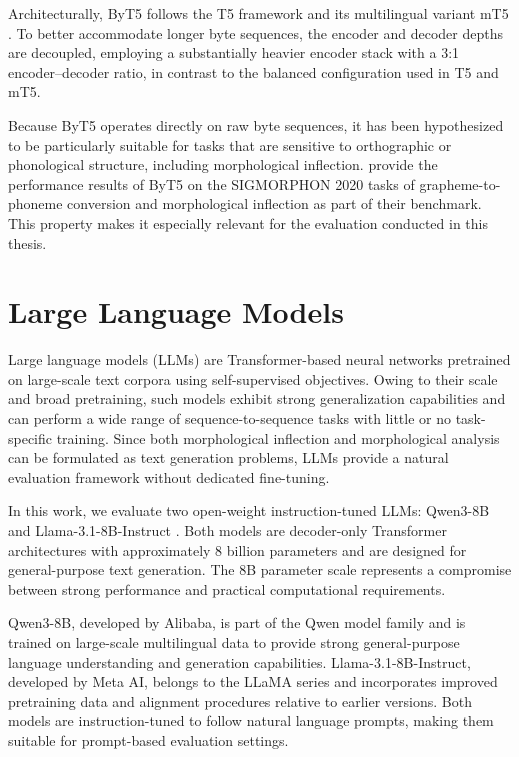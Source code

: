 Architecturally, ByT5 follows the T5 framework and its multilingual variant mT5 \parencite{xue-etal-2021-mt5}. To better accommodate longer byte sequences, the encoder and decoder depths are decoupled, employing a substantially heavier encoder stack with a 3:1 encoder–decoder ratio, in contrast to the balanced configuration used in T5 and mT5.

Because ByT5 operates directly on raw byte sequences, it has been hypothesized to be particularly suitable for tasks that are sensitive to orthographic or phonological structure, including morphological inflection. \textcite{xue-etal-2022-byt5} provide the performance results of ByT5 on the SIGMORPHON 2020 \parencite{vylomova-etal-2020-sigmorphon} tasks of grapheme-to-phoneme conversion and morphological inflection as part of their benchmark. This property makes it especially relevant for the evaluation conducted in this thesis.

\section{Large Language Models}

Large language models (LLMs) are Transformer-based neural networks pretrained on large-scale text corpora using self-supervised objectives. Owing to their scale and broad pretraining, such models exhibit strong generalization capabilities and can perform a wide range of sequence-to-sequence tasks with little or no task-specific training. Since both morphological inflection and morphological analysis can be formulated as text generation problems, LLMs provide a natural evaluation framework without dedicated fine-tuning.

In this work, we evaluate two open-weight instruction-tuned LLMs: Qwen3-8B \parencite{qwen3technicalreport} and Llama-3.1-8B-Instruct \parencite{llama3technicalreport}. Both models are decoder-only Transformer architectures with approximately 8 billion parameters and are designed for general-purpose text generation. The 8B parameter scale represents a compromise between strong performance and practical computational requirements.

Qwen3-8B, developed by Alibaba, is part of the Qwen model family and is trained on large-scale multilingual data to provide strong general-purpose language understanding and generation capabilities. Llama-3.1-8B-Instruct, developed by Meta AI, belongs to the LLaMA series and incorporates improved pretraining data and alignment procedures relative to earlier versions. Both models are instruction-tuned to follow natural language prompts, making them suitable for prompt-based evaluation settings.

